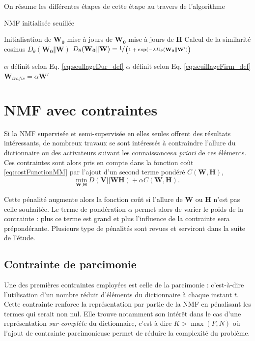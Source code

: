 On résume les différentes étapes de cette étape au travers de l'algorithme

\begin{algorithm}
\caption{NMF initialisée seuillée}
\begin{algorithmic} 
\STATE Initialisation de $\mathbf{W_0}$
	\STATE mise à jours de $\mathbf{W_0}$
	\STATE mise à jours de $\mathbf{H}$
\ENDFOR
\STATE Calcul de la similarité cosinus $D_{\theta}(\mathbf{W_0} \Vert \mathbf{W})$
	\STATE $D_{\theta}(\mathbf{W_0} \Vert \mathbf{W}) = \sfrac{1}{\left(1+\exp({-\lambda D_{\theta}(\mathbf{W_0} \Vert \mathbf{W'})}\right)}$
\ENDIF

	\STATE $\alpha$ définit selon Eq. \ref{eq:seullageDur_def}
	\STATE $\alpha$ définit selon Eq. \ref{eq:seuillageFirm_def}
\ENDIF
\STATE $\mathbf{W}_{trafic} = \alpha \mathbf{W'}$
\end{algorithmic}
\end{algorithm}


\section{NMF avec contraintes}\label{part:NMF_contrainte}
Si la NMF supervisée et semi-supervisée en elles seules offrent des résultats intéressants, de nombreux travaux se sont intéressés à contraindre l'allure du dictionnaire ou des activateurs suivant les connaissances\textit{a priori} de ces éléments. Ces contraintes sont alors pris en compte dans la fonction coût \ref{eq:costFunctionMM} par l'ajout d'un second terme pondéré $C(\mathbf{W},\mathbf{H})$, 
\begin{equation}
\underset{\textbf{W},\textbf{H}}{\text{min}}~D\left(\textbf{V} \vert\vert \textbf{WH}\right) + \alpha C(\mathbf{W},\mathbf{H}).
\end{equation}

Cette pénalité augmente alors la fonction coût si l'allure de $\mathbf{W}$ ou $\mathbf{H}$ n'est pas celle souhaitée. Le terme de pondération $\alpha$ permet alors de varier le poids de la contrainte : plus ce terme est grand et plus l'influence de la contrainte sera prépondérante. Plusieurs type de pénalités sont revues et serviront dans la suite de l'étude. 

\subsection{Contrainte de parcimonie}
Une des premières contraintes employées est celle de la parcimonie \cite{hoyer_non-negative_2004} \cite{le2015sparse} : c'est-à-dire l'utilisation d'un nombre réduit d'éléments du dictionnaire à chaque instant $t$. Cette contrainte renforce la représentation par partie de la NMF en pénalisant les termes qui serait non nul. Elle trouve notamment son intérêt dans le cas d'une représentation \textit{sur-complète} du dictionnaire, c'est à dire $K > \max(F,N)$ où l'ajout de contrainte parcimonieuse permet de réduire la complexité du problème. 

